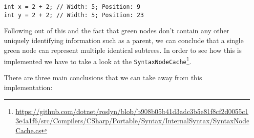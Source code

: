 \begin{lstlisting}
int x = 2 + 2; // Width: 5; Position: 9
int y = 2 + 2; // Width: 5; Position: 23
\end{lstlisting}

Following out of this and the fact that green nodes don't contain any other uniquely identifying information such as a parent, we can conclude that a single green node can represent multiple identical subtrees. In order to see how this is implemented we have to take a look at the \verb|SyntaxNodeCache|\footnote{\url{https://github.com/dotnet/roslyn/blob/b908b05b41d3adc3b5e81f8cf2d0055c13e4a1f6/src/Compilers/CSharp/Portable/Syntax/InternalSyntax/SyntaxNodeCache.cs}}.

There are three main conclusions that we can take away from this implementation:


